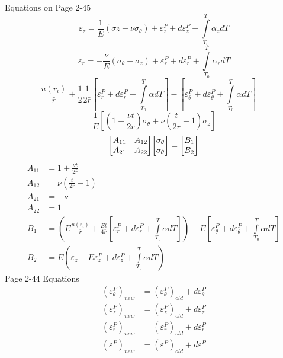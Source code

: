 \documentclass[12pt]{article}
\begin{document}
Equations on Page 2-45
\begin{equation}
\varepsilon_{z} = \frac{1}{E} \left( \sigma{z}-\nu\sigma_{\theta} \right)+\varepsilon_{z}^P+d\varepsilon_{z}^P+\int\limits_{T_0}^T \alpha_{z}dT
\end{equation}
\begin{equation}
\varepsilon_{r} = -\frac{\nu}{E} \left( \sigma_{\theta}-\sigma_{z} \right)+\varepsilon_{r}^P+d\varepsilon_{r}^P+\int\limits_{T_0}^T \alpha_{r}dT
\end{equation}
\begin{equation}
\frac{u(r_i)}{\bar{r}}+\frac{1}{2} \frac{1}{2 \bar{r}} \left[ \varepsilon_{r}^P+d\varepsilon_{r}^P+\int\limits_{T_0}^T \alpha dT \right]-\left[ \varepsilon_{\theta}^P+d\varepsilon_{\theta}^P+\int\limits_{T_0}^T \alpha dT \right] =
\end{equation}
\begin{equation}
\frac{1}{E} \left[ \left( 1+ \frac{\nu t}{2 \bar{r}} \right) \sigma_{\theta}+\nu \left( \frac{t}{2 \bar{r}}-1 \right) \sigma_{z} \right]
\end{equation}
\begin{equation}
\mqty[ A_{11}&A_{12}\\A_{21}&A_{22}]\mqty[ \sigma_{\theta} \\ \sigma_{\theta}]=\mqty[ B_{1} \\ B_{2}]
\end{equation}
\begin{align}
A_{11} &= 1+ \frac{\nu t}{2 \bar{r}} \\
A_{12} &= \nu \left( \frac{t}{2 \bar{r}} -1 \right) \\
A_{21} &= -\nu \\
A_{22} &= 1 \\
B_{1} &=  \left( E \frac{u(r_i)}{\bar{r}} +\frac{Et}{4 \bar{r}} \left[ \varepsilon_{r}^P+d\varepsilon_{r}^P+\int\limits_{T_0}^T \alpha dT \right] \right)-E \left[ \varepsilon_{\theta}^P+d\varepsilon_{\theta}^P+\int\limits_{T_0}^T \alpha dT \right] \\
B_{2} &= E \left( \varepsilon_z- E\varepsilon_{z}^P+d\varepsilon_{z}^P+\int\limits_{T_0}^T \alpha dT \right)
\end{align}
Page 2-44 Equations
\begin{align}
\left( \varepsilon_{\theta}^P \right)_{new} &= \left( \varepsilon_{\theta}^P \right)_{old}+d\varepsilon_{\theta}^P\\
\left( \varepsilon_{z}^P \right)_{new} &= \left( \varepsilon_{z}^P \right)_{old}+d\varepsilon_{z}^P\\
\left( \varepsilon_{r}^P \right)_{new} &= \left( \varepsilon_{r}^P \right)_{old}+d\varepsilon_{r}^P\\
\left( \varepsilon^P \right)_{new} &= \left( \varepsilon^P \right)_{old}+d\varepsilon^P
\end{align}
\end{document}
